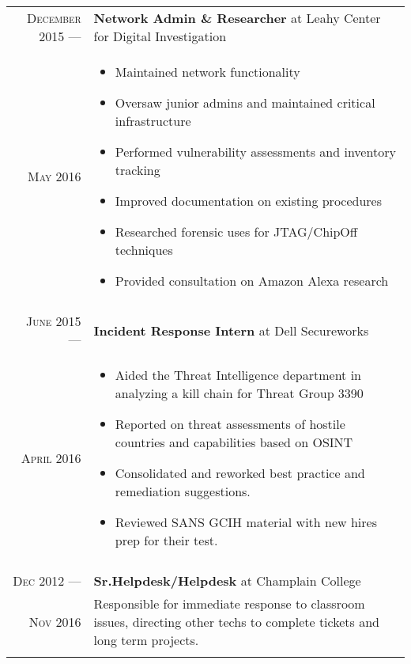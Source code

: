 \documentclass[a4paper,10pt]{article}
\begin{document}
\begin{tabular}{r|p{11cm}}
 \textsc{December 2015} ---            & \textbf {Network Admin \& Researcher} at Leahy Center for Digital Investigation \\
 \textsc{May 2016} \hphantom{---} & \footnotesize{
        \vspace{-2mm}
         \begin{itemize}[leftmargin=*]
            \item Maintained network functionality
            \item Oversaw junior admins and maintained critical infrastructure 
            \item Performed vulnerability assessments and inventory tracking
            \item Improved documentation on existing procedures
            \item Researched forensic uses for JTAG/ChipOff techniques
            \item Provided consultation on Amazon Alexa research
        \end{itemize}
        \vspace*{-\baselineskip}
    }\\
\multicolumn{2}{c}{} \\

 \textsc{June 2015} ---            & \textbf{Incident Response Intern} at Dell Secureworks\\
 \textsc{April 2016} \hphantom{---} & \footnotesize{
         \vspace{-2mm}
         \begin{itemize}[leftmargin=*]
            \item Aided the Threat Intelligence department in analyzing a kill chain for Threat Group 3390
            \item Reported on threat assessments of hostile countries and capabilities based on OSINT
            \item Consolidated and reworked best practice and remediation suggestions.
            \item Reviewed SANS GCIH material with new hires prep for their test.
        \end{itemize}
        \vspace*{-\baselineskip}
    }\\
\multicolumn{2}{c}{} \\

\textsc{Dec 2012} ---            & \textbf{Sr.Helpdesk/Helpdesk} at Champlain College\\
\textsc{Nov 2016} \hphantom{---} & \footnotesize{ Responsible for immediate response to classroom issues, directing other techs to complete tickets and long term projects.
         \vspace{-2mm}
        \vspace*{-\baselineskip}
    }\\
\multicolumn{2}{c}{}  \\


\end{tabular}
\end{document}
